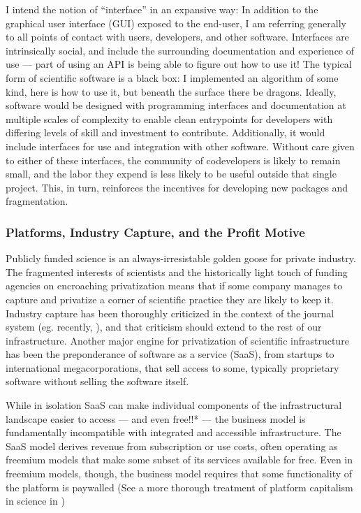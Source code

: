 \documentclass[11pt]{article}
\begin{document}
\begin{multicols}{2}
I intend the notion of ``interface'' in an expansive way: In addition to
the graphical user interface (GUI) exposed to the end-user, I am
referring generally to all points of contact with users, developers, and
other software. Interfaces are intrinsically social, and include the
surrounding documentation and experience of use --- part of using an API
is being able to figure out how to use it! The typical form of
scientific software is a black box: I implemented an algorithm of some
kind, here is how to use it, but beneath the surface there be dragons.
Ideally, software would be designed with programming interfaces and
documentation at multiple scales of complexity to enable clean
entrypoints for developers with differing levels of skill and investment
to contribute. Additionally, it would include interfaces for use and
integration with other software. Without care given to either of these
interfaces, the community of codevelopers is likely to remain small, and
the labor they expend is less likely to be useful outside that single
project. This, in turn, reinforces the incentives for developing new
packages and fragmentation.

\hypertarget{platforms-industry-capture-and-the-profit-motive}{%
\subsubsection{Platforms, Industry Capture, and the Profit
Motive}\label{platforms-industry-capture-and-the-profit-motive}}

Publicly funded science is an always-irresistable golden goose for
private industry. The fragmented interests of scientists and the
historically light touch of funding agencies on encroaching
privatization means that if some company manages to capture and
privatize a corner of scientific practice they are likely to keep it.
Industry capture has been thoroughly criticized in the context of the
journal system (eg. recently, \cite{brembsReplacingAcademicJournals2021} ), and that criticism should
extend to the rest of our infrastructure. Another major engine for
privatization of scientific infrastructure has been the preponderance of
software as a service (SaaS), from startups to international
megacorporations, that sell access to some, typically proprietary
software without selling the software itself.

While in isolation SaaS can make individual components of the
infrastructural landscape easier to access --- and even free!!* --- the
business model is fundamentally incompatible with integrated and
accessible infrastructure. The SaaS model derives revenue from
subscription or use costs, often operating as freemium models that make
some subset of its services available for free. Even in freemium models,
though, the business model requires that some functionality of the
platform is paywalled (See a more thorough treatment of platform
capitalism in science in \cite{mirowskiFutureOpenScience2018} )


\end{multicols}
\end{document}
